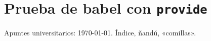 \documentclass[11pt,a4paper]{article}
\begin{document}
\tableofcontents
\section{Prueba de babel con \texttt{provide}}
Apuntes universitarios: \today. Índice, ñandú, «comillas».
\end{document}
